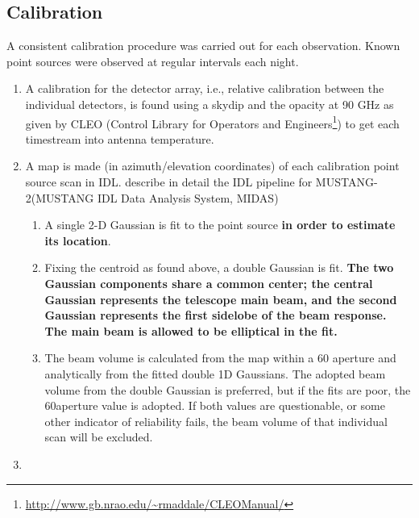 \documentclass[twocolumn]{aastex62}
\newcommand{\MUSTANG}{MUSTANG-2\xspace}
\begin{document}
\subsection{Calibration}


A consistent calibration procedure was carried out for each observation.
Known point sources were observed at regular intervals each night.

\begin{enumerate}
    \item A calibration for the detector array, i.e., relative calibration between
        the individual detectors, is found using a skydip and the
        opacity at 90 GHz as given by CLEO (Control Library for Operators and
        Engineers\footnote{\url{http://www.gb.nrao.edu/~rmaddale/CLEOManual/}}) to get
        each timestream into
        antenna temperature.
    \item A map is made (in azimuth/elevation coordinates) of each calibration
        point source scan in IDL.  \cite{Romero2019a} describe in detail the
        IDL pipeline for \MUSTANG (MUSTANG IDL Data Analysis System, MIDAS)
        \begin{enumerate}
            \item A single 2-D Gaussian is fit to the point source {\bf in order to estimate its location}. 
            \item Fixing the centroid as found above, a double Gaussian is fit. {\bf The two Gaussian components share a common center; the central Gaussian represents the telescope main beam, and the second Gaussian represents the first sidelobe of the beam response. The main beam is allowed to be elliptical in the fit.}
            \item The beam volume is calculated from the map within a 60\arcsec
                aperture and analytically from the fitted double 1D Gaussians. The
                adopted beam volume from the double Gaussian is preferred, but
                if the fits are poor, the 60\arcsec aperture value is 
                adopted. If both values are questionable, or some other
                indicator of reliability fails, the beam volume of that
                individual scan will be excluded.
        \end{enumerate}
    \item

\end{enumerate}
\end{document}
